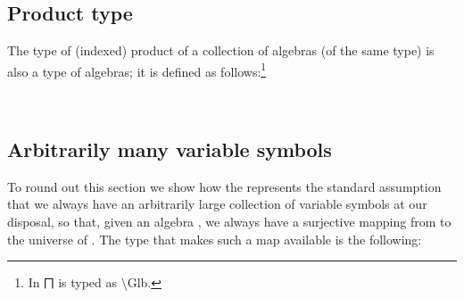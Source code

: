 \documentclass[a4paper,USenglish,cleveref,autoref,thm-restate]{lipics-v2019}
\begin{document}
\subsection{Product type}
The type of (indexed) product of a collection of algebras (of the same type) is also a type of algebras; it is defined as follows:\footnote{In \agdamode ⨅ is typed as \textbackslash Glb.}
\begin{code}%
\>[1]\AgdaSpace{}%
\AgdaSymbol{:}\AgdaSpace{}%
\AgdaSymbol{\{}\AgdaSpace{}%
\AgdaSymbol{:}\AgdaSpace{}%
\AgdaSpace{}%
\AgdaSpace{}%
\AgdaSymbol{\}(}\AgdaSpace{}%
\AgdaSymbol{:}\AgdaSpace{}%
\AgdaSpace{}%
\AgdaSpace{}%
\AgdaSpace{}%
\AgdaSpace{}%
\AgdaSpace{}%
\AgdaSymbol{)}\AgdaSpace{}%
\AgdaSpace{}%
\AgdaSpace{}%
\AgdaSymbol{(}\AgdaSpace{}%
\AgdaSpace{}%
\AgdaSymbol{)}\AgdaSpace{}%
\<%
\\
%
\>[1]\AgdaSpace{}%
\AgdaSpace{}%
\AgdaSymbol{=}%
\>[8]\AgdaSymbol{((}\AgdaSpace{}%
\AgdaSymbol{:}\AgdaSpace{}%
\AgdaSymbol{\AgdaUnderscore{})}\AgdaSpace{}%
\AgdaSpace{}%
\AgdaSpace{}%
\AgdaSpace{}%
\AgdaSpace{}%
\AgdaSymbol{)}\AgdaSpace{}%
\AgdaOperator{\AgdaInductiveConstructor{,}}%
\>[31]\AgdaSpace{}%
\AgdaSpace{}%
\AgdaSpace{}%
\AgdaSpace{}%
\AgdaSpace{}%
\AgdaSymbol{(}\AgdaSpace{}%
\AgdaSpace{}%
\AgdaSpace{}%
\AgdaSymbol{)}\AgdaSpace{}%
\AgdaSpace{}%
\AgdaSpace{}%
\AgdaSpace{}%
\AgdaSpace{}%
\AgdaSpace{}%
\<%
\end{code}

\subsection{Arbitrarily many variable symbols}
To round out this section we show how the \agdaualib represents the standard assumption that we always have an arbitrarily large collection  of variable symbols at our disposal, so that, given an algebra , we always have a surjective mapping from  to the universe \AgdaSpace{}\AgdaSpace{} of . The type that makes such a map available is the following:
\end{document}
